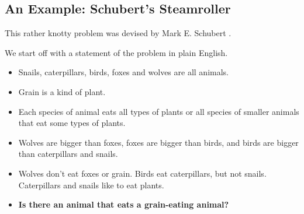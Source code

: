 \begin{itemize}
\subsection{An Example: Schubert's Steamroller}

This rather knotty problem was devised by Mark E. Schubert \XXX{}.

We start off with a statement of the problem in plain English.
\begin{itemize}
\item Snails, caterpillars, birds, foxes and wolves are all animals.
\item Grain is a kind of plant.
\item Each species of animal eats all types of plants
or all species of smaller animals that eat some types of plants.
\item Wolves are bigger than foxes, foxes are bigger than birds, and
birds are bigger than caterpillars and snails.
\item Wolves don't eat foxes or grain.  Birds eat caterpillars, but not snails.
Caterpillars and snails like to eat plants.
\item \textbf{Is there an animal that eats a grain-eating animal?}
\end{itemize}


\end{itemize}

